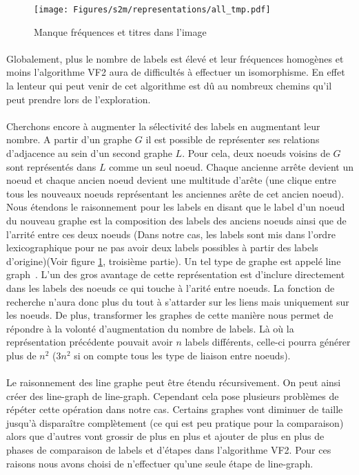 \documentclass[12pt,french,twoside]{report}
\begin{document}
\begin{figure}
  \texttt{[image: Figures/s2m/representations/all\_tmp.pdf]}
  \caption{\label{representations}Manque fréquences et titres dans l'image}
\end{figure}

\paragraph{}Globalement, plus le nombre de labels est élevé et leur fréquences homogènes et moins l'algorithme VF2 aura de
difficultés à effectuer un isomorphisme. En effet la lenteur qui peut venir de cet algorithme est dû au nombreux chemins qu'il
peut prendre lors de l'exploration.

\paragraph{}Cherchons encore à augmenter la sélectivité des labels en augmentant leur nombre. A partir d'un graphe $G$ il est
possible de représenter ses relations d'adjacence au sein d'un second graphe $L$. Pour cela, deux noeuds voisins de $G$ sont
représentés dans $L$ comme un seul noeud. Chaque ancienne arrête devient un noeud et chaque ancien noeud devient une multitude
d'arête (une clique entre tous les nouveaux noeuds représentant les anciennes arête de cet ancien noeud). Nous étendons le 
raisonnement pour les labels en disant que le label d'un noeud du nouveau graphe est la composition des labels des anciens
noeuds ainsi que de l'arrité entre ces deux noeuds (Dans notre cas, les labels sont mis dans l'ordre lexicographique pour ne pas
avoir deux labels possibles à partir des labels d'origine)(Voir figure \ref{representations},
troisième partie). Un tel type de graphe est appelé line graph~\cite{orlin_line-digraphs_1978}. L'un des
gros avantage de cette représentation est d'inclure directement dans les labels des noeuds ce qui touche à l'arité entre noeuds.
La fonction
de recherche n'aura donc plus du tout à s'attarder sur les liens mais uniquement sur les noeuds. De plus, transformer les graphes
de cette manière nous permet de répondre à la volonté d'augmentation du nombre de labels. Là où la représentation précédente
pouvait avoir $n$ labels différents, celle-ci pourra générer plus de $n^2$ ($3n^2$ si on compte tous les type de liaison entre
noeuds).

\paragraph{}Le raisonnement des line graphe peut être étendu récursivement. On peut ainsi créer des line-graph de line-graph.
Cependant cela pose plusieurs problèmes de répéter cette opération dans notre cas. Certains graphes vont diminuer de taille
jusqu'à disparaître complètement (ce qui est peu pratique pour la comparaison) alors que d'autres vont grossir de plus en plus
et ajouter de plus en plus de phases de comparaison de labels et d'étapes dans l'algorithme VF2. Pour ces raisons nous avons
choisi de n'effectuer qu'une seule étape de line-graph.
\end{document}
